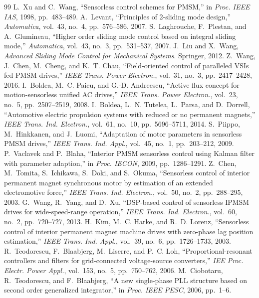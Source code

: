 \documentclass[10pt,twoside,a4paper]{article}
\begin{document}
\begin{thebibliography}{99}
 L.~Xu and C.~Wang, ``Sensorless control schemes for PMSM,'' in \emph{Proc. IEEE IAS}, 1998, pp.~483--489.
 A.~Levant, ``Principles of 2-sliding mode design,'' \emph{Automatica}, vol.~43, no.~4, pp.~576--586, 2007.
 S.~Laghrouche, F.~Plestan, and A.~Glumineau, ``Higher order sliding mode control based on integral sliding mode,'' \emph{Automatica}, vol.~43, no.~3, pp.~531--537, 2007.
 J.~Liu and X.~Wang, \emph{Advanced Sliding Mode Control for Mechanical Systems}. Springer, 2012.
 Z.~Wang, J.~Chen, M.~Cheng, and K.~T. Chau, ``Field-oriented control of paralleled VSIs fed PMSM drives,'' \emph{IEEE Trans. Power Electron.}, vol.~31, no.~3, pp.~2417--2428, 2016.
 I.~Boldea, M.~C. Paicu, and G.-D. Andreescu, ``Active flux concept for motion-sensorless unified AC drives,'' \emph{IEEE Trans. Power Electron.}, vol.~23, no.~5, pp.~2507--2519, 2008.
 I.~Boldea, L.~N. Tutelea, L.~Parsa, and D.~Dorrell, ``Automotive electric propulsion systems with reduced or no permanent magnets,'' \emph{IEEE Trans. Ind. Electron.}, vol.~61, no.~10, pp.~5696--5711, 2014.
 S.~Piippo, M.~Hinkkanen, and J.~Luomi, ``Adaptation of motor parameters in sensorless PMSM drives,'' \emph{IEEE Trans. Ind. Appl.}, vol.~45, no.~1, pp.~203--212, 2009.
 P.~Vaclavek and P.~Blaha, ``Interior PMSM sensorless control using Kalman filter with parameter adaption,'' in \emph{Proc. IECON}, 2009, pp.~1286--1291.
 Z.~Chen, M.~Tomita, S.~Ichikawa, S.~Doki, and S.~Okuma, ``Sensorless control of interior permanent magnet synchronous motor by estimation of an extended electromotive force,'' \emph{IEEE Trans. Ind. Electron.}, vol.~50, no.~2, pp.~288--295, 2003.
 G.~Wang, R.~Yang, and D.~Xu, ``DSP-based control of sensorless IPMSM drives for wide-speed-range operation,'' \emph{IEEE Trans. Ind. Electron.}, vol.~60, no.~2, pp.~720--727, 2013.
 H.~Kim, M.~C. Harke, and R.~D. Lorenz, ``Sensorless control of interior permanent magnet machine drives with zero-phase lag position estimation,'' \emph{IEEE Trans. Ind. Appl.}, vol.~39, no.~6, pp.~1726--1733, 2003.
 R.~Teodorescu, F.~Blaabjerg, M.~Liserre, and P.~C. Loh, ``Proportional-resonant controllers and filters for grid-connected voltage-source converters,'' \emph{IEE Proc. Electr. Power Appl.}, vol.~153, no.~5, pp.~750--762, 2006.
 M.~Ciobotaru, R.~Teodorescu, and F.~Blaabjerg, ``A new single-phase PLL structure based on second order generalized integrator,'' in \emph{Proc. IEEE PESC}, 2006, pp.~1--6.

\end{thebibliography}
\end{document}
